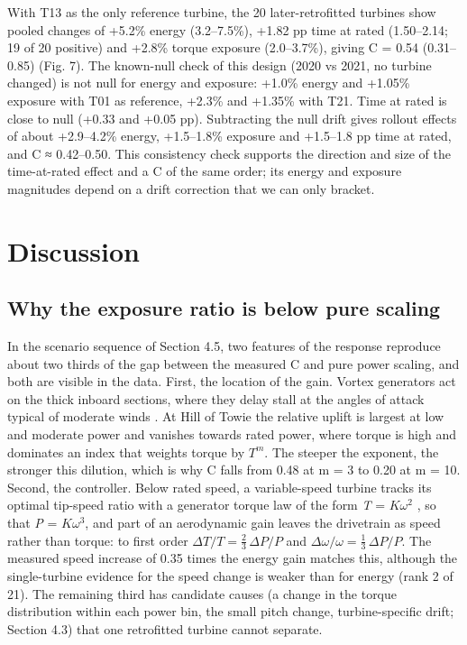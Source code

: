 \documentclass[preprint,12pt]{elsarticle}
\begin{document}
With T13 as the only reference turbine, the 20 later-retrofitted turbines show pooled changes of +5.2\% energy (3.2--7.5\%), +1.82 pp time at rated (1.50--2.14; 19 of 20 positive) and +2.8\% torque exposure (2.0--3.7\%), giving C = 0.54 (0.31--0.85) (Fig. 7). The known-null check of this design (2020 vs 2021, no turbine changed) is not null for energy and exposure: +1.0\% energy and +1.05\% exposure with T01 as reference, +2.3\% and +1.35\% with T21. Time at rated is close to null (+0.33 and +0.05 pp). Subtracting the null drift gives rollout effects of about +2.9--4.2\% energy, +1.5--1.8\% exposure and +1.5--1.8 pp time at rated, and C ≈ 0.42--0.50. This consistency check supports the direction and size of the time-at-rated effect and a C of the same order; its energy and exposure magnitudes depend on a drift correction that we can only bracket.

\section{Discussion}

\subsection{Why the exposure ratio is below pure scaling}

In the scenario sequence of Section 4.5, two features of the response reproduce about two thirds of the gap between the measured C and pure power scaling, and both are visible in the data. First, the location of the gain. Vortex generators act on the thick inboard sections, where they delay stall at the angles of attack typical of moderate winds \cite{lin02,zhao}. At Hill of Towie the relative uplift is largest at low and moderate power and vanishes towards rated power, where torque is high and dominates an index that weights torque by \(T^m\). The steeper the exponent, the stronger this dilution, which is why C falls from 0.48 at m = 3 to 0.20 at m = 10. Second, the controller. Below rated speed, a variable-speed turbine tracks its optimal tip-speed ratio with a generator torque law of the form \emph{T} = \(K\omega^2\) \cite{bossanyi00,johnson06,burton11}, so that \emph{P} = \(K\omega^3\), and part of an aerodynamic gain leaves the drivetrain as speed rather than torque: to first order \(\Delta T/T = \tfrac{2}{3}\,\Delta P/P\) and \(\Delta\omega/\omega = \tfrac{1}{3}\,\Delta P/P\). The measured speed increase of 0.35 times the energy gain matches this, although the single-turbine evidence for the speed change is weaker than for energy (rank 2 of 21). The remaining third has candidate causes (a change in the torque distribution within each power bin, the small pitch change, turbine-specific drift; Section 4.3) that one retrofitted turbine cannot separate.
\end{document}
